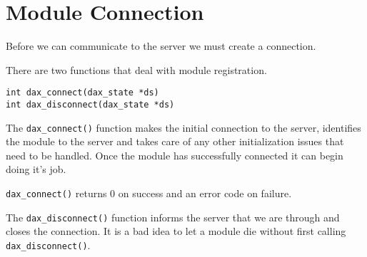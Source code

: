 \section{Module Connection}
Before we can communicate to the server we must create a connection.

There are two functions that deal with module registration.
\begin{verbatim}
int dax_connect(dax_state *ds)
int dax_disconnect(dax_state *ds)
\end{verbatim}

The \verb|dax_connect()| function makes the
initial connection to the server, identifies the module to the server and takes
care of any other initialization issues that need to be handled.  Once the
module has successfully connected it can begin doing it's job.

\verb|dax_connect()| returns 0 on success and an error code on failure.

The \verb|dax_disconnect()| function informs
the server that we are through and closes the connection.  It is a bad idea to
let a module die without first calling \verb|dax_disconnect()|.
